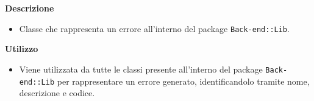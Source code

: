         \textbf{\\ \\ Descrizione} 
          \begin{itemize}
            \item[] Classe che rappresenta un errore all'interno del package \texttt{Back-end::Lib}.
          \end{itemize}      
        \textbf{Utilizzo}  
          \begin{itemize}
            \item[] Viene utilizzata da tutte le classi presente all'interno del package \texttt{Back-end::Lib} per rappresentare un errore generato, identificandolo tramite nome, descrizione e codice.
          \end{itemize}